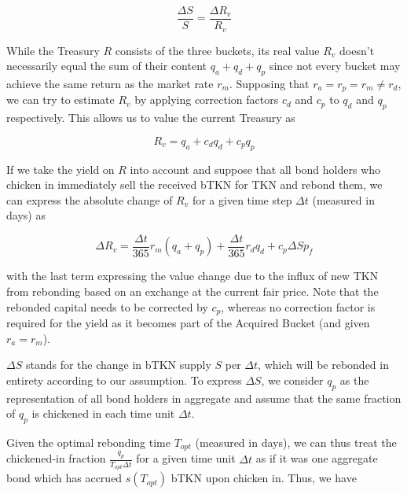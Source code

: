 \documentclass{article}
\begin{document}
\begin{equation}
  \label{eq:same_growth_rate}
  \frac{\Delta S}{S} = \frac{\Delta R_v}{R_v}
\end{equation}


While the Treasury $R$ consists of the three buckets, its real value $R_v$ doesn't necessarily equal the sum of their content $q_a+q_d+q_p$ since not every bucket may achieve the same return as the market rate $r_m$. Supposing that $r_a=r_p=r_m \neq r_d$, we can try to estimate $R_v$ by applying correction factors $c_d$ and $c_p$ to $q_d$ and $q_p$ respectively. This allows us to value the current Treasury as

\begin{equation}
  \label{eq:correction-factors}
  R_v = q_a + c_d q_d + c_p q_p
\end{equation}

If we take the yield on $R$ into account and suppose that all bond holders who chicken in immediately sell the received bTKN for TKN and rebond them, we can express the absolute change of $R_v$ for a given time step $\Delta t$ (measured in days) as

\begin{equation}
  \label{eq:treasury-growth}
  \Delta R_v = \frac{\Delta t}{365} r_m (q_a + q_p) + \frac{\Delta t}{365} r_d  q_d + c_p \Delta S p_f 
\end{equation}

with the last term expressing the value change due to the influx of new TKN from rebonding based on an exchange at the current fair price. Note that the rebonded capital needs to be corrected by $c_p$, whereas no correction factor is required for the yield as it becomes part of the Acquired Bucket (and given $r_a=r_m$).

$\Delta S$ stands for the change in bTKN supply $S$ per $\Delta t$, which will be rebonded in entirety according to our assumption. To express $\Delta S$, we consider $q_p$ as the representation of all bond holders in aggregate and assume that the same fraction of $q_p$ is chickened in each time unit $\Delta t$. 

Given the optimal rebonding time $T_{opt}$ (measured in days), we can thus treat the chickened-in fraction  $\frac{q_p}{T_{opt} \Delta t}$ for a given time unit $\Delta t$ as if it was one aggregate bond which has accrued $s(T_{opt})$ bTKN upon chicken in. Thus, we have
\end{document}
